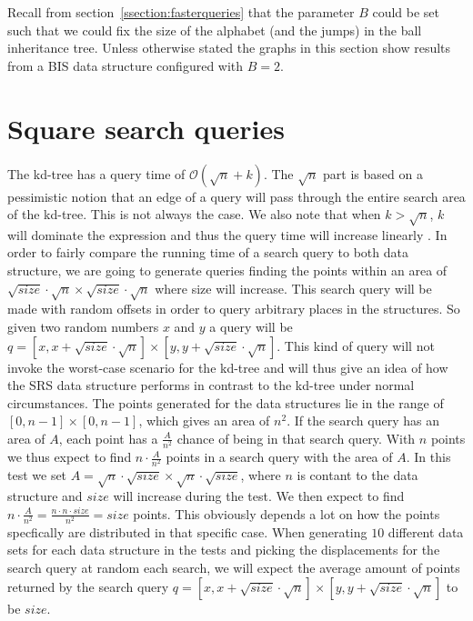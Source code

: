 Recall from section~\ref{ssection:fasterqueries} that the parameter $B$ could be set such that we could fix the size of the alphabet (and the jumps) in the ball inheritance tree. Unless otherwise stated the graphs in this section show results from a BIS data structure configured with $B=2$. 




\section{Square search queries}

The kd-tree has a query time of $\mathcal{O}(\sqrt{n}+k)$. The $\sqrt{n}$ part is based on a pessimistic notion that an edge of a query will pass through the entire search area of the kd-tree. This is not always the case. We also note that when $k > \sqrt{n}$, $k$ will dominate the expression and thus the query time will increase linearly . In order to fairly compare the running time of a search query to both data structure, we are going to generate queries finding the points within an area of $\sqrt{size}\cdot\sqrt{n} \times \sqrt{size}\cdot\sqrt{n}$ where size will increase. This search query will be made with random offsets in order to query arbitrary places in the structures. So given two random numbers $x$ and $y$ a query will be $q = [x, x+\sqrt{size}\cdot\sqrt{n}] \times [y, y+\sqrt{size}\cdot\sqrt{n}]$. This kind of query will not invoke the worst-case scenario for the kd-tree and will thus give an idea of how the SRS data structure performs in contrast to the kd-tree under normal circumstances. The points generated for the data structures lie in the range of $[0,n-1] \times [0,n-1]$, which gives an area of $n^2$. If the search query has an area of $A$, each point has a $\frac{A}{n^2}$ chance of being in that search query. With $n$ points we thus expect to find $n\cdot \frac{A}{n^2}$ points in a search query with the area of $A$. In this test we set $A = \sqrt{n}\cdot\sqrt{size}\times\sqrt{n}\cdot\sqrt{size}$, where $n$ is contant to the data structure and $size$ will increase during the test. We then expect to find $n\cdot\frac{A}{n^2} = \frac{n\cdot n \cdot size}{n^2} = size$ points. This obviously depends a lot on how the points specfically are distributed in that specific case. When generating $10$ different data sets for each data structure in the tests and picking the displacements for the search query at random each search, we will expect the average amount of points returned by the search query $q = [x, x+\sqrt{size}\cdot\sqrt{n}] \times [y, y+\sqrt{size}\cdot\sqrt{n}]$ to be $size$.

